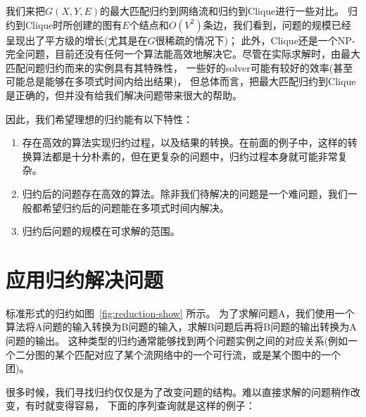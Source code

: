 

我们来把$G(X,Y,E)$的最大匹配归约到网络流和归约到Clique进行一些对比。
归约到Clique时所创建的图有$E$个结点和$O(V^2)$条边，我们看到，问题的规模已经呈现出了平方级的增长(尤其是在$G$很稀疏的情况下)；
此外，Clique还是一个NP-完全问题，目前还没有任何一个算法能高效地解决它。尽管在实际求解时，由最大匹配问题归约而来的实例具有其特殊性，
一些好的solver可能有较好的效率(甚至可能总是能够在多项式时间内给出结果)，
但总体而言，把最大匹配归约到Clique是正确的，但并没有给我们解决问题带来很大的帮助。

因此，我们希望理想的归约能有以下特性：

\begin{enumerate}
 \item 存在高效的算法实现归约过程，以及结果的转换。在前面的例子中，这样的转换算法都是十分朴素的，但在更复杂的问题中，归约过程本身就可能非常复杂。
 \item 归约后的问题存在高效的算法。除非我们待解决的问题是一个难问题，我们一般都希望归约后的问题能在多项式时间内解决。
 \item 归约后问题的规模在可求解的范围。
\end{enumerate}

\section{应用归约解决问题}

标准形式的归约如图~\ref{fig:reduction-show} 所示。
为了求解问题A，我们使用一个算法将A问题的输入转换为B问题的输入，求解B问题后再将B问题的输出转换为A问题的输出。
这种类型的归约通常能够找到两个问题实例之间的对应关系(例如一个二分图的某个匹配对应了某个流网络中的一个可行流，或是某个图中的一个团)。



很多时候，我们寻找归约仅仅是为了改变问题的结构。难以直接求解的问题稍作改变，有时就变得容易，
下面的序列查询就是这样的例子：

